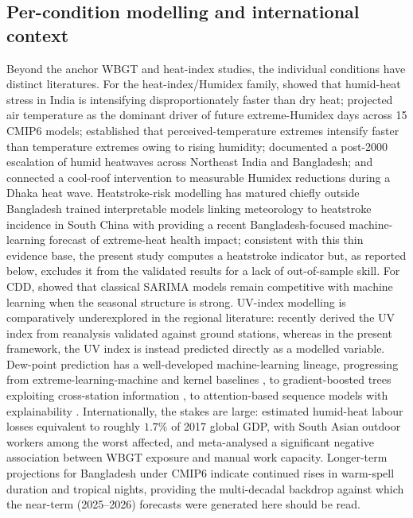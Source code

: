 \documentclass[review,11pt]{elsarticle}
\begin{document}
\subsection{Per-condition modelling and international context}
Beyond the anchor WBGT and heat-index studies, the individual conditions have
distinct literatures. For the heat-index/Humidex family, \citet{sojan2024humidheat}
showed that humid-heat stress in India is intensifying disproportionately faster
than dry heat; \citet{kushwaha2026humidex} projected air temperature as the
dominant driver of future extreme-Humidex days across 15 CMIP6 models;
\citet{scoccimarro2017humidity} established that perceived-temperature extremes
intensify faster than temperature extremes owing to rising humidity;
\citet{saha2025postescalation} documented a post-2000 escalation of humid heatwaves
across Northeast India and Bangladesh; and \citet{tabassum2025coolroofs} connected
a cool-roof intervention to measurable Humidex reductions during a Dhaka heat wave.
Heatstroke-risk modelling has matured chiefly outside Bangladesh %
\citet{xuh2024heatstroke} trained interpretable models linking meteorology to
heatstroke incidence in South China with \citet{ehsan2026extremeheat} providing a
recent Bangladesh-focused machine-learning forecast of extreme-heat health impact;
consistent with this thin evidence base, the present study computes a heatstroke
indicator but, as reported below, excludes it from the validated results for a lack
of out-of-sample skill. For CDD, \citet{bilgili2023cdd} showed that classical
SARIMA models remain competitive with machine learning when the seasonal structure
is strong. UV-index modelling is comparatively underexplored in the regional
literature: \citet{teggi2026uvindex} recently derived the UV index from reanalysis
validated against ground stations, whereas in the present framework, the UV index is
instead predicted directly as a modelled variable. Dew-point prediction has a
well-developed machine-learning lineage, progressing from extreme-learning-machine
and kernel baselines \citep{mohammadi2015elm,qasem2019dewpoint}, to gradient-boosted
trees exploiting cross-station information \citep{yao2022catboost}, to
attention-based sequence models with explainability \citep{abdullah2025xai}.
Internationally, the stakes are large: \citet{parsons2021labor} estimated humid-heat
labour losses equivalent to roughly $1.7\%$ of 2017 global GDP, with South Asian
outdoor workers among the worst affected, and \citet{flouris2022} meta-analysed a
significant negative association between WBGT exposure and manual work capacity.
Longer-term projections for Bangladesh under CMIP6 \citep{khatun2024} indicate
continued rises in warm-spell duration and tropical nights, providing the
multi-decadal backdrop against which the near-term (2025--2026) forecasts were generated here should be read.
\end{document}

